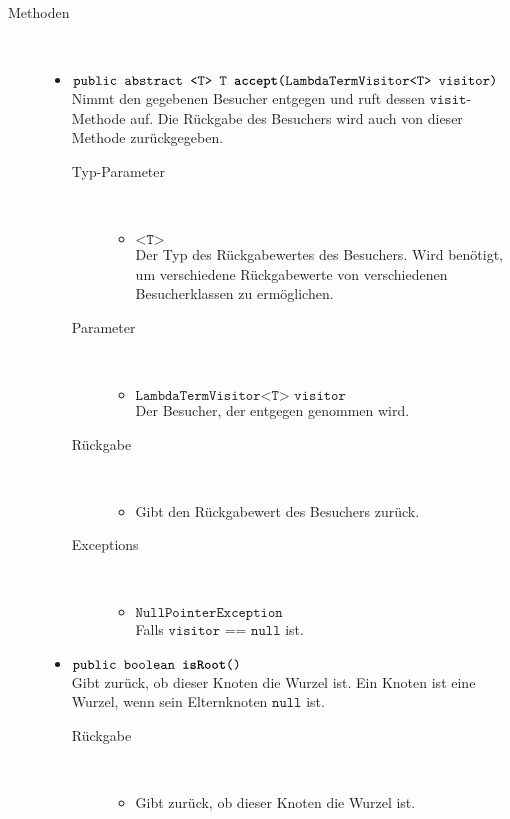 \begin{description}
\item[Methoden] \hfill \\
	\vspace{-.8cm}
	\begin{itemize}
		\item $\texttt{public abstract <T> T \textbf{accept}(LambdaTermVisitor<T> visitor)}$ \\ Nimmt den gegebenen Besucher entgegen und ruft dessen $\texttt{visit}$-Methode auf. Die Rückgabe des Besuchers wird auch von dieser Methode zurückgegeben.
		\begin{description}
			\item[Typ-Parameter] \hfill \\
				\vspace{-.8cm}
				\begin{itemize}
					\item $\texttt{<T>}$ \\ Der Typ des Rückgabewertes des Besuchers. Wird benötigt, um verschiedene Rückgabewerte von verschiedenen Besucherklassen zu ermöglichen.
				\end{itemize}
			\item[Parameter] \hfill \\
			\vspace{-.8cm}
			\begin{itemize}
				\item $\texttt{LambdaTermVisitor<T> visitor}$ \\ Der Besucher, der entgegen genommen wird.
			\end{itemize}
			\item[Rückgabe] \hfill \\
			\vspace{-.8cm}
			\begin{itemize}
				\item Gibt den Rückgabewert des Besuchers zurück.
			\end{itemize}
			\item[Exceptions] \hfill \\
			\vspace{-.8cm}
			\begin{itemize}
				\item $\texttt{NullPointerException}$ \\ Falls $\texttt{visitor == null}$ ist.
			\end{itemize}
		\end{description}
		
		\item $\texttt{public boolean \textbf{isRoot}()}$ \\ Gibt zurück, ob dieser Knoten die Wurzel ist. Ein Knoten ist eine Wurzel, wenn sein Elternknoten $\texttt{null}$ ist.
		\begin{description}
			\item[Rückgabe] \hfill \\
			\vspace{-.8cm}
			\begin{itemize}
				\item Gibt zurück, ob dieser Knoten die Wurzel ist.
			\end{itemize}
		\end{description}
		

\end{itemize}
\end{description}
